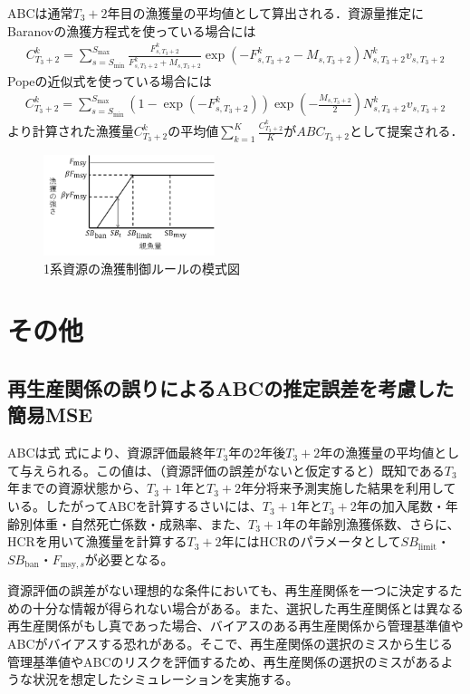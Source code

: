 \documentclass[11pt]{jsarticle}
\begin{document}
ABCは通常$T_{3}+2$年目の漁獲量の平均値として算出される．資源量推定にBaranovの漁獲方程式を使っている場合には
\begin{eqnarray}
  C_{T_3+2}^k=\sum_{s=S_{\mathrm{min}}}^{S_{\mathrm{max}}} \frac{F_{s,T_3+2}^k}{F_{s,T_3+2}^k+M_{s,T_3+2}}
  \exp(- F_{s,T_3+2}^k-M_{s,T_3+2}) N_{s,T_3+2}^k v_{s,T_3+2}
\label{ABC_eq1}
\end{eqnarray}
Popeの近似式を使っている場合には
\begin{eqnarray}
  C_{T_3+2}^k=\sum_{s=S_{\mathrm{min}}}^{S_{\mathrm{max}}} (1-\exp(- F_{s,T_3+2}^k)) \exp(-\frac{M_{s,T_3+2}}{2}) N_{s,T_3+2}^k v_{s,T_3+2}
\label{ABC_eq2}
\end{eqnarray}
より計算された漁獲量$C_{T_3+2}^k$の平均値$\sum_{k=1}^K \frac{C_{T_3+2}^k}{K}$が$ABC_{T_3+2}$として提案される．

\begin{figure}[t]
  \includegraphics[width=5cm]{fig_HCR.png}  
  \caption{
    1系資源の漁獲制御ルールの模式図
  }
  \label{fig_HCR}
\end{figure}

\section{その他}
\subsection{再生産関係の誤りによるABCの推定誤差を考慮した簡易MSE\label{sec:mse}}

ABCは式\label{ABC_eq1} 式\label{ABC_eq2}により、資源評価最終年$T_3$年の2年後$T_3+2$年の漁獲量の平均値として与えられる。この値は、（資源評価の誤差がないと仮定すると）既知である$T_3$年までの資源状態から、$T_3+1$年と$T_3+2$年分将来予測実施した結果を利用している。したがってABCを計算するさいには、$T_3+1$年と$T_3+2$年の加入尾数・年齢別体重・自然死亡係数・成熟率、また、$T_3+1$年の年齢別漁獲係数、さらに、HCRを用いて漁獲量を計算する$T_3+2$年にはHCRのパラメータとして$S\!B_{\mathrm{limit}}$・$S\!B_{\mathrm{ban}}$・$F_{\mathrm{msy},s}$が必要となる。

資源評価の誤差がない理想的な条件においても、再生産関係を一つに決定するための十分な情報が得られない場合がある。また、選択した再生産関係とは異なる再生産関係がもし真であった場合、バイアスのある再生産関係から管理基準値やABCがバイアスする恐れがある。そこで、再生産関係の選択のミスから生じる管理基準値やABCのリスクを評価するため、再生産関係の選択のミスがあるような状況を想定したシミュレーションを実施する。
\end{document}

